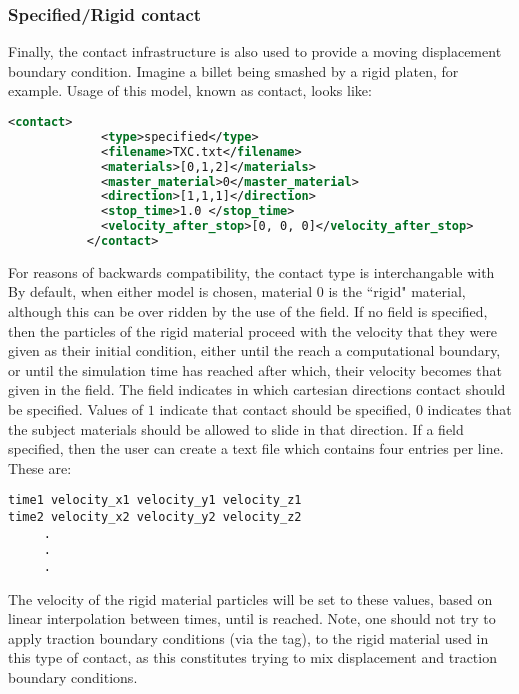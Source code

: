 \subsubsection{Specified/Rigid contact}
Finally, the contact infrastructure is also used to provide a moving
displacement boundary condition.  Imagine a billet being smashed by a
rigid platen, for example.  Usage of this model, known as
 contact, looks like:

\begin{lstlisting}[language=XML]
           <contact>
             <type>specified</type>
             <filename>TXC.txt</filename>
             <materials>[0,1,2]</materials>
             <master_material>0</master_material>
             <direction>[1,1,1]</direction>
             <stop_time>1.0 </stop_time>
             <velocity_after_stop>[0, 0, 0]</velocity_after_stop>
           </contact>
\end{lstlisting}
For reasons of backwards compatibility, the
 contact type is interchangable with
  By default, when either model is
chosen, material 0 is the ``rigid" material, although this can be
over ridden by the use of the
 field.  If no
 field is specified, then the particles of the
rigid material proceed with the velocity that they were given as their
initial condition, either until the reach a computational boundary, or
until the simulation time has reached  after
which, their velocity becomes that given in the
 field.  The 
field indicates in which cartesian directions contact should be specified.
Values of $1$ indicate that contact should be specified, $0$ indicates that
the subject materials should be allowed to slide in that direction.  If
a  field  specified, then the user can
create a text file which contains four entries per line.  These are:
\begin{lstlisting}[backgroundcolor=\color{background}]
time1 velocity_x1 velocity_y1 velocity_z1
time2 velocity_x2 velocity_y2 velocity_z2
     .
     .
     .
\end{lstlisting}
The velocity of the rigid material particles will be set to these values,
based on linear interpolation between times, until 
is reached.  Note, one should not try to apply traction boundary conditions
(via the   tag), to the rigid material used in this type of contact, as this constitutes trying to mix displacement and traction boundary
conditions. 


